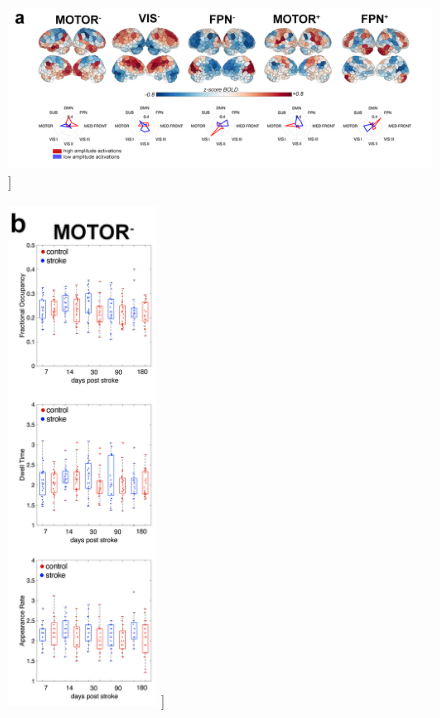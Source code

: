 \documentclass[phd,tocprelim]{cornell}
\renewcommand{\caption}[1]{\singlespacing\hangcaption{#1}\normalspacing}
\begin{document}
\null
\vfill
\clearpage
\null
\vfill
\begin{figure}[h!]
		\ContinuedFloat
		\captionsetup{labelformat=adja-page}
    \centering
    \includegraphics[width=1\textwidth]{chapter2/SupplementaryFig11a.png}
    \caption[]{}
\end{figure}
\null
\vfill
\clearpage
\null
\vfill
\begin{figure}[h!]
		\ContinuedFloat
		\captionsetup{labelformat=adja-page}
    \centering
    \includegraphics[width=0.35\textwidth]{chapter2/SupplementaryFig11b.png}
    \caption[]{}
\end{figure}
\null
\vfill
\clearpage
\null
\vfill
\end{document}
